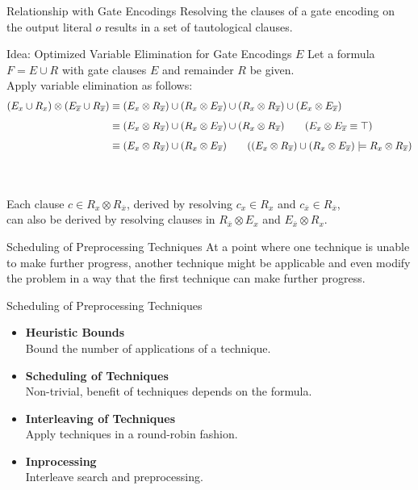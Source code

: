 \documentclass[t]{sdqbeamer}
\begin{document}
\begin{frame}{Relationship with Gate Encodings}
Resolving the clauses of a gate encoding on the output literal $o$ results in a set of tautological clauses.\\[1em]
\begin{block}{Idea: Optimized Variable Elimination for Gate Encodings $E$}
Let a formula $F = E \cup R$ with gate clauses $E$ and remainder $R$ be given.\\
Apply variable elimination as follows:
\vspace*{-1ex}
\begin{align*}
( E_x \cup R_x) \otimes (E_{\overline x} \cup R_{\overline x}) 
&\equiv (E_x \otimes R_{\overline x}) \cup (R_x \otimes E_{\overline x}) \cup (R_x \otimes R_{\overline x}) \cup (E_x \otimes E_{\overline x})\\[1ex]
%
&\equiv (E_x \otimes R_{\overline x}) \cup (R_x \otimes E_{\overline x}) \cup (R_x \otimes R_{\overline x}) \tag{$E_x \otimes E_{\overline x} \equiv \top$}\\[1ex]
&\equiv (E_x \otimes R_{\overline x}) \cup (R_x \otimes E_{\overline x})
\tag{$(E_x \otimes R_{\overline x}) \cup (R_x \otimes E_{\overline x}) \models R_x \otimes R_{\overline x}$}
\end{align*}
\end{block}~\\[-1ex]
\\[1ex]
Each clause $c \in R_x \otimes R_{\overline x}$, derived by resolving $c_x \in R_x$ and $c_{\overline x} \in R_{\overline x}$,\\ can also be derived by resolving clauses in $R_{\overline x} \otimes E_x$ and $E_{\overline x} \otimes R_x$.
\end{frame}

\begin{frame}{Scheduling of Preprocessing Techniques}
At a point where one technique is unable to make further progress, another technique might be applicable and even modify the problem in a way that the first technique can make further progress.\\[1ex]

\begin{block}{Scheduling of Preprocessing Techniques}
\begin{itemize}\setlength{\itemsep}{1ex}
    \item \textbf{Heuristic Bounds}\\[1pt]
    Bound the number of applications of a technique.
    \item \textbf{Scheduling of Techniques}\\[1pt]
    Non-trivial, benefit of techniques depends on the formula.
    \item \textbf{Interleaving of Techniques}\\[1pt]
    Apply techniques in a round-robin fashion.
    \item \textbf{Inprocessing}\\[1pt]
    Interleave search and preprocessing.
\end{itemize}
\end{block}
\end{frame}
\end{document}
